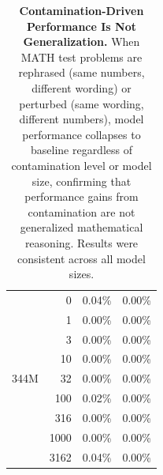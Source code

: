 \begin{table}[t!]
\begin{tabular}{crrr}
        \multirow{9}{*}{344M} 
          & 0    & 0.04\% & 0.00\% \\
          & 1    & 0.00\% & 0.00\% \\
          & 3    & 0.00\% & 0.00\% \\
          & 10   & 0.00\% & 0.00\% \\
          & 32   & 0.00\% & 0.00\% \\
          & 100  & 0.02\% & 0.00\% \\
          & 316  & 0.00\% & 0.00\% \\
          & 1000 & 0.00\% & 0.00\% \\
          & 3162 & 0.04\% & 0.00\% \\
        \bottomrule
    \end{tabular}
    \caption{\textbf{Contamination-Driven Performance Is Not Generalization.} When MATH test problems are rephrased (same numbers, different wording) or perturbed (same wording, different numbers), model performance collapses to baseline regardless of contamination level or model size, confirming that performance gains from contamination are not generalized mathematical reasoning. Results were consistent across all model sizes.}
    \label{tab:rephrase_perturb}
    \vspace{-0.75cm}
\end{table}

